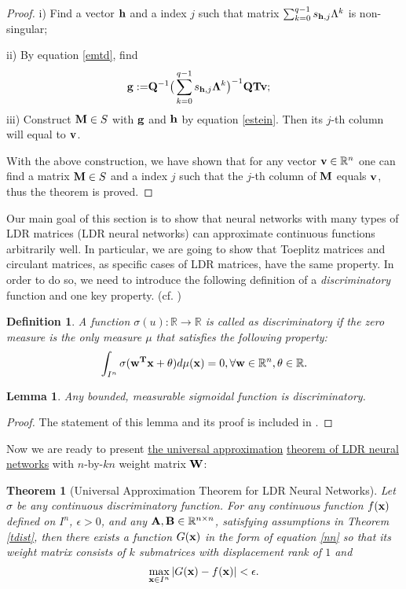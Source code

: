 \documentclass{article}
\newtheorem{theorem}{Theorem}[section]
\newtheorem{lemma}{Lemma}[section]
\newtheorem{definition}{Definition}[section]
\begin{document}
\begin{proof}
i) Find a vector ${\bf h}$ and a index $j$ such that matrix $\sum_{k=0}^{q-1}s_{{\bf h}, j}\Lambda^k$ is non-singular;

ii) By equation \eqref{emtd}, find
\begin{align*}
{\bf g}:=&{\bf Q}^{-1}\big(\sum_{k=0}^{q-1}s_{{\bf h}, j}{\bf \Lambda}^k\big)^{-1}{\bf Q}{\bf T}{\bf v};
\end{align*}
iii) Construct ${\bf M}\in S$ with ${\bf g}$ and ${\bf h}$ by equation \eqref{estein}. Then its $j$-th column will equal to ${\bf v}$.

With the above construction, we have shown that for any vector ${\bf v}\in\mathbb{R}^n$ one can find a matrix ${\bf M}\in S$ and a index $j$ such that the $j$-th column of ${\bf M}$ equals ${\bf v}$, thus the theorem is proved.
\end{proof}
Our main goal of this section is to show that neural networks with many types of LDR matrices (LDR neural networks) can approximate continuous functions arbitrarily well. In particular, we are going to show that Toeplitz matrices and circulant matrices, as specific cases of LDR matrices, have the same property. In order to do so, we need to introduce the following definition of a \textit{discriminatory} function and one key property. (cf. \cite{cybenko1989approximation})
\begin{definition}
A function $\sigma(u):\mathbb{R}\rightarrow\mathbb{R}$ is called as discriminatory if the zero measure is the only measure $\mu$ that satisfies the following property:
\begin{equation}
\int_{I^n}\sigma({\bf w^T x}+ \theta)d\mu({\bf x}) = 0,\forall{\bf w}\in\mathbb{R}^n, \theta\in\mathbb{R}.
\end{equation}
\end{definition}
\begin{lemma}\label{ldisc}
Any bounded, measurable sigmoidal function is discriminatory.
\end{lemma}
\begin{proof}
The statement of this lemma and its proof is included in \cite{cybenko1989approximation}.
\end{proof}
Now we are ready to present \underline{the universal approximation} \underline{theorem of LDR neural networks} with $n$-by-$kn$ weight matrix $\bf W$:
\begin{theorem}
[Universal Approximation Theorem for LDR Neural Networks]
\label{appr}
Let $\sigma$ be any continuous discriminatory function. For any continuous function $f({\bf x})$ defined on $I^n$,
$\epsilon>0$, and any ${\bf A}, {\bf B}\in\mathbb{R}^{n\times n}$, satisfying assumptions in Theorem \ref{tdist},
then there exists a function $G({\bf x})$ in the form of equation \eqref{nn} so that its weight matrix consists of $k$
submatrices with displacement rank of $1$
and
\begin{equation}
\max_{{\bf x}\in I^n}|G({\bf x}) - f({\bf x})|<\epsilon.
\end{equation}
\end{theorem}
\end{document}
